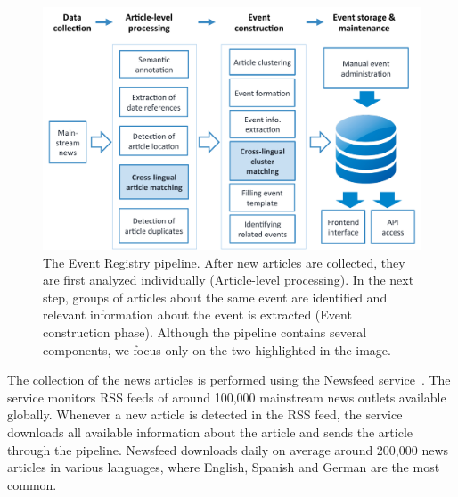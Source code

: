 \documentclass[twoside,11pt]{article}
\begin{document}
\begin{figure}[tbp]
\centering
\includegraphics[width=\textwidth]{pipeline.pdf}
\caption{\label{fig:erpipeline}  The Event Registry pipeline. After new articles are collected, they are first analyzed individually (Article-level processing). In the next step, groups of articles about the same event are identified and relevant information about the event is extracted (Event construction phase). Although the pipeline contains several components, we focus only on the two highlighted in the image.}
\end{figure}

The collection of the news articles is performed using the Newsfeed service~\cite{Trampus2012}. The service monitors RSS feeds of around 100,000 mainstream news outlets available globally. Whenever a new article is detected in the RSS feed, the service downloads all available information about the article and sends the article through the pipeline. Newsfeed downloads daily on average around 200,000 news articles in various languages, where English, Spanish and German are the most common.
\end{document}
